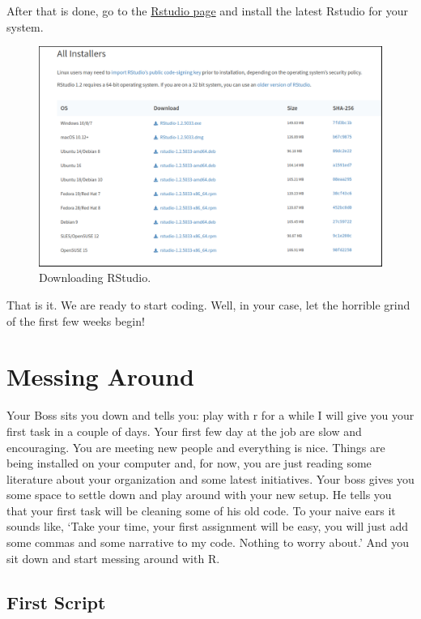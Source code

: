 \documentclass[]{book}
\begin{document}
After that is done, go to the \href{https://rstudio.com/products/rstudio/download/}{Rstudio page} and install the latest Rstudio for your system.

\begin{figure}
\centering
\includegraphics{rstudioInstall.png}
\caption{Downloading RStudio.}
\end{figure}

That is it. We are ready to start coding. Well, in your case, let the horrible grind of the first few weeks begin!

\hypertarget{messing-around}{%
\section{Messing Around}\label{messing-around}}

Your Boss sits you down and tells you: play with r for a while I will give you your first task in a couple of days. Your first few day at the job are slow and encouraging. You are meeting new people and everything is nice. Things are being installed on your computer and, for now, you are just reading some literature about your organization and some latest initiatives. Your boss gives you some space to settle down and play around with your new setup. He tells you that your first task will be cleaning some of his old code. To your naive ears it sounds like, `Take your time, your first assignment will be easy, you will just add some commas and some narrative to my code. Nothing to worry about.' And you sit down and start messing around with R.

\hypertarget{first-script}{%
\subsection{First Script}\label{first-script}}
\end{document}
